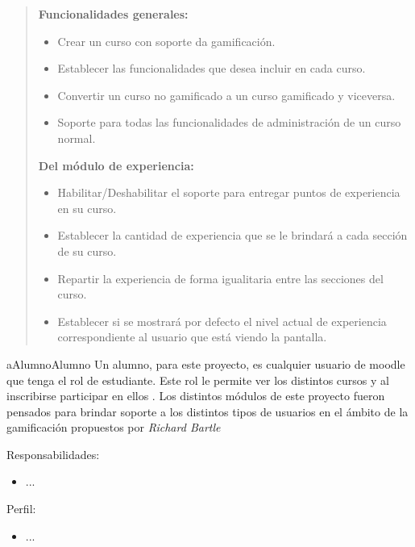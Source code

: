     \begin{quote}
    {\bf Funcionalidades generales:}
        \begin{itemize}
        \item Crear un curso con soporte da gamificación.
        \item Establecer las funcionalidades que desea incluir en cada curso.
        \item Convertir un curso no gamificado a un curso gamificado y viceversa.
        \item Soporte para todas las funcionalidades de administración de un curso
              normal.
        \end{itemize}

    {\bf Del módulo de experiencia:}
        \begin{itemize}
        \item Habilitar/Deshabilitar el soporte para entregar puntos de experiencia
              en su curso.
        \item Establecer la cantidad de experiencia que se le brindará a cada
              sección de su curso.
        \item Repartir la experiencia de forma igualitaria entre las secciones del
              curso.
        \item Establecer si se mostrará por defecto el nivel actual de experiencia
              correspondiente al usuario que está viendo la pantalla.
        \end{itemize}

    \end{quote}


    \begin{actor}{aAlumno}{Alumno}{%
    Un alumno, para este proyecto, es cualquier usuario de moodle que tenga el rol de
    estudiante. Este rol le permite ver los distintos cursos y al inscribirse participar
    en ellos \cite{MoodleRol}. Los distintos módulos de este proyecto fueron pensados para
    brindar soporte a los distintos tipos de usuarios en el ámbito de la gamificación
    propuestos por {\it Richard Bartle} \cite{TiposDeUsuario}\\}

    \item[Responsabilidades:] \hfill
        \begin{itemize}
        \item ...
        \end{itemize}

    \item[Perfil:] \hfill
        \begin{itemize}
        \item ...
        \end{itemize}
    \end{actor}

